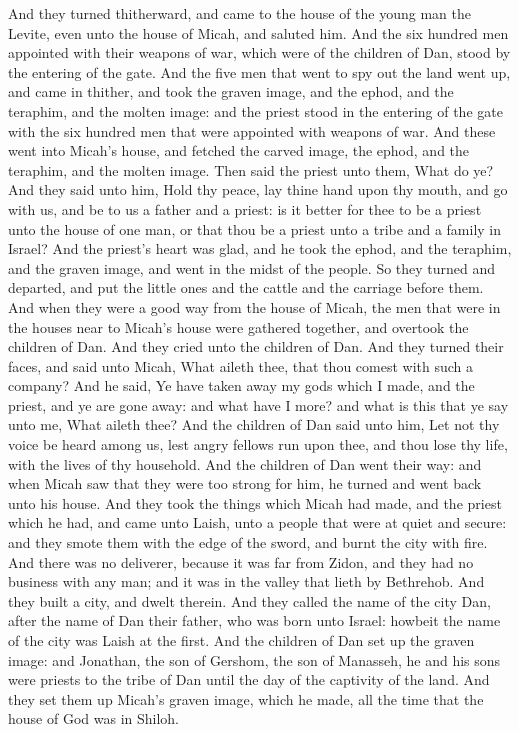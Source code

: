 \begin{biblechapter}
\verse And they turned thitherward, and came to the house of the young man the Levite, even unto the house of Micah, and saluted him.
\verse And the six hundred men appointed with their weapons of war, which were of the children of Dan, stood by the entering of the gate.
\verse And the five men that went to spy out the land went up, and came in thither, and took the graven image, and the ephod, and the teraphim, and the molten image: and the priest stood in the entering of the gate with the six hundred men that were appointed with weapons of war.
\verse And these went into Micah's house, and fetched the carved image, the ephod, and the teraphim, and the molten image. Then said the priest unto them, What do ye?
\verse And they said unto him, Hold thy peace, lay thine hand upon thy mouth, and go with us, and be to us a father and a priest: is it better for thee to be a priest unto the house of one man, or that thou be a priest unto a tribe and a family in Israel?
\verse And the priest's heart was glad, and he took the ephod, and the teraphim, and the graven image, and went in the midst of the people.
\verse So they turned and departed, and put the little ones and the cattle and the carriage before them.
\verse And when they were a good way from the house of Micah, the men that were in the houses near to Micah's house were gathered together, and overtook the children of Dan.
\verse And they cried unto the children of Dan. And they turned their faces, and said unto Micah, What aileth thee, that thou comest with such a company?
\verse And he said, Ye have taken away my gods which I made, and the priest, and ye are gone away: and what have I more? and what is this that ye say unto me, What aileth thee?
\verse And the children of Dan said unto him, Let not thy voice be heard among us, lest angry fellows run upon thee, and thou lose thy life, with the lives of thy household.
\verse And the children of Dan went their way: and when Micah saw that they were too strong for him, he turned and went back unto his house.
\verse And they took the things which Micah had made, and the priest which he had, and came unto Laish, unto a people that were at quiet and secure: and they smote them with the edge of the sword, and burnt the city with fire.
\verse And there was no deliverer, because it was far from Zidon, and they had no business with any man; and it was in the valley that lieth by Bethrehob. And they built a city, and dwelt therein.
\verse And they called the name of the city Dan, after the name of Dan their father, who was born unto Israel: howbeit the name of the city was Laish at the first.
\verse And the children of Dan set up the graven image: and Jonathan, the son of Gershom, the son of Manasseh, he and his sons were priests to the tribe of Dan until the day of the captivity of the land.
\verse And they set them up Micah's graven image, which he made, all the time that the house of God was in Shiloh.
\end{biblechapter}


